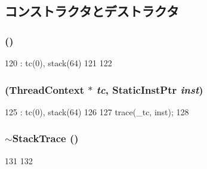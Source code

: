 \subsection{コンストラクタとデストラクタ}
\hypertarget{classX86ISA_1_1StackTrace_a5a9b2e3bba2262e73b20f87325efd063}{
\subsubsection[{StackTrace}]{ ()}}
\label{classX86ISA_1_1StackTrace_a5a9b2e3bba2262e73b20f87325efd063}



\begin{DoxyCode}
120         : tc(0), stack(64)
121     {
122     }
\end{DoxyCode}
\hypertarget{classX86ISA_1_1StackTrace_a7c751415d8c87372fc7d24513309cf1b}{
\subsubsection[{StackTrace}]{ ({\bf ThreadContext} $\ast$ {\em tc}, \/  {\bf StaticInstPtr} {\em inst})}}
\label{classX86ISA_1_1StackTrace_a7c751415d8c87372fc7d24513309cf1b}



\begin{DoxyCode}
125         : tc(0), stack(64)
126     {
127         trace(_tc, inst);
128     }
\end{DoxyCode}
\hypertarget{classX86ISA_1_1StackTrace_adec953886bb73db4f2ec91ed12810135}{
\subsubsection[{$\sim$StackTrace}]{\setlength{\rightskip}{0pt plus 5cm}$\sim${\bf StackTrace} ()}}
\label{classX86ISA_1_1StackTrace_adec953886bb73db4f2ec91ed12810135}



\begin{DoxyCode}
131     {
132     }
\end{DoxyCode}


